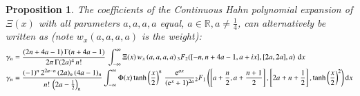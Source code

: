 \documentclass[a4paper,11pt,twoside]{amsart}
\newtheorem{proposition}[theorem]{Proposition}
\newcommand{\verifiedeq}{=}
\newcommand{\verifiedeq}{\stackrel{\checkmark}{=}}
\begin{document}
\begin{proposition}
The coefficients of the Continuous Hahn polynomial expansion of $\Xi(x)$ with all parameters $a,a,a,a$ equal, $a \in \mathbb{R}, a \ne \frac14$, can alternatively be written as (note $w_x(a,a,a,a)$ is the weight): 
\begin{align}
\gamma_n &\verifiedeq \frac{(2n+4a-1)\,\Gamma(n+4a-1)}{2\pi\,\Gamma(2a)^4\,n!}\,\int_{-\infty}^{\infty} \Xi(x)\,w_x\left(a,a,a,a)\,{}_3F_2([-n,n+4a-1,a+ix],[2a,2a],a\right)\,\mathrm{d}x \\
\gamma_n &\verifiedeq \frac{(-1)^n\,2^{2a-n}\,(2a)_n\,(4a-1)_n}{n!\,\left(2a-\frac12\right)_n}\int_{-\infty}^{\infty} \Phi(x)\tanh\left(\frac{x}{2}\right)^{n}\,\frac{\mathrm{e}^{ax}}{(\mathrm{e}^x+1)^{2a}}{}_2F_1\left(\left[a+\frac{n}{2}, a+\frac{n+1}{2}\right],\left[2a+n+\frac12\right],\tanh\left(\frac{x}{2}\right)^2\right)\mathrm{d}x \notag
\end{align}
\end{proposition}
\end{document}
